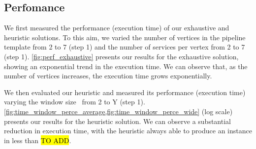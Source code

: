 \subsection{Perfomance}\label{subsec:experiments_performance}
We first measured the performance (execution time) of our exhaustive and heuristic solutions. To this aim, we varied the number of vertices in the pipeline template from 2 to 7 (step 1) and the number of services per vertex from 2 to 7 (step 1). \cref{fig:perf_exhaustive} presents our results for the exhaustive solution, showing an exponential trend in the execution time. We can observe that, as the number of vertices increases, the execution time grows exponentially.

We then evaluated our heuristic and measured its performance (execution time) varying the window size \windowsize\ from 2 to Y (step 1). \cref{fig:time_window_perce_average,fig:time_window_perce_wide} (log scale) presents our results for the heuristic solution. We can observe a substantial reduction in execution time, with the heuristic always able to produce an instance in less than \hl{TO ADD}.

